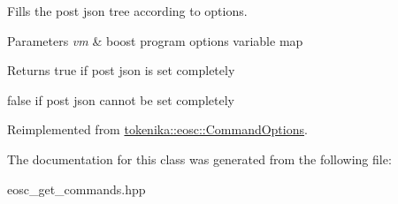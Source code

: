 Fills the post json tree according to options. 


\begin{DoxyParams}{Parameters}
{\em vm} & boost program options variable map \\
\hline
\end{DoxyParams}
\begin{DoxyReturn}{Returns}
true if post json is set completely 

false if post json cannot be set completely 
\end{DoxyReturn}


Reimplemented from \hyperlink{classtokenika_1_1eosc_1_1_command_options_a7aecc9aa79ca65f6abbd568ff8ff77a7}{tokenika\+::eosc\+::\+Command\+Options}.



The documentation for this class was generated from the following file\+:\begin{DoxyCompactItemize}
\item 
eosc\+\_\+get\+\_\+commands.\+hpp\end{DoxyCompactItemize}

